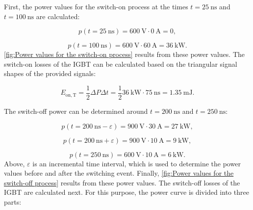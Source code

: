 \begin{solutionblock}
	First, the power values for the switch-on process at the times $t = \SI{25}{\ns}$ and $ t = \SI{100}{\ns}$ are calculated:

	\begin{equation}
		p(t = \SI{25}{\ns}) = \SI{600}{\volt} \cdot \SI{0}{\ampere} = 0,
	\end{equation}

	\begin{equation}
		p(t = \SI{100}{\ns}) = \SI{600}{\volt} \cdot \SI{60}{\ampere} = \SI{36}{\kilo\watt}.
	\end{equation}
	\autoref{fig:Power values for the switch-on process}  results from these power values.
	The switch-on losses of the IGBT can be calculated based on the triangular signal shapes of the provided signals:

	\begin{equation}
		E_{\mathrm{on,T}} = \frac{1}{2} \Delta P \Delta t = \frac{1}{2} \SI{36}{\kilo\watt} \cdot \SI{75}{\ns} = \SI {1.35}{\milli\joule}.
	\end{equation}

	The switch-off power can be determined around $t = \SI{200}{\ns}$ and $t = \SI{250}{\ns}$:

	\begin{equation}
		p(t = \SI{200}{\ns}-\varepsilon) = \SI{900}{\volt} \cdot \SI{30}{\ampere} = \SI{27}{\kilo\watt},
	\end{equation}

	\begin{equation}
		p(t = \SI{200}{\ns}+\varepsilon) = \SI{900}{\volt} \cdot \SI{10}{\ampere} = \SI{9}{\kilo\watt},
	\end{equation}

	\begin{equation}
		p(t = \SI{250}{\ns}) = \SI{600}{\volt} \cdot \SI{10}{\ampere} = \SI{6}{\kilo\watt}.
	\end{equation}
	Above, $\varepsilon$ is an incremental time interval, which is used to determine the power values before and after the switching event. Finally, \autoref{fig:Power values for the switch-off process} results from these power values. The switch-off losses of the IGBT are calculated next. For this purpose, the power curve is divided into three parts:


\end{solutionblock}
